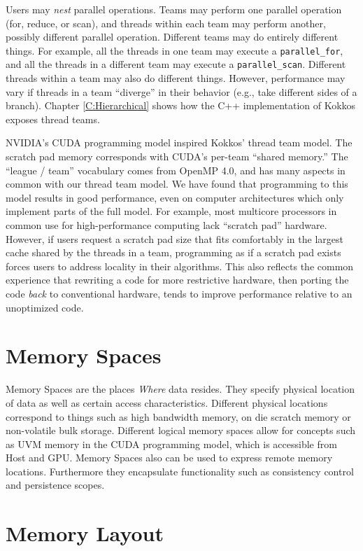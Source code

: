 Users may \emph{nest} parallel operations.
Teams may perform one parallel operation (for, reduce, or scan),
and threads within each team may perform another, possibly different parallel operation.
Different teams may do entirely different things.
For example, all the threads in one team may execute a \lstinline!parallel_for!,
and all the threads in a different team may execute a \lstinline!parallel_scan!.
Different threads within a team may also do different things.
However, performance may vary if threads in a team ``diverge'' in their behavior
(e.g., take different sides of a branch).
Chapter \ref{C:Hierarchical} shows how the C++ implementation of Kokkos exposes thread teams.

NVIDIA's CUDA programming model inspired Kokkos' thread team model.
The scratch pad memory corresponds with CUDA's per-team ``shared memory.''
The ``league / team'' vocabulary comes from OpenMP 4.0,
and has many aspects in common with our thread team model.
We have found that programming to this model results in good performance,
even on computer architectures which only implement parts of the full model.
For example, most multicore processors in common use for high-performance computing lack ``scratch pad'' hardware.
However, if users request a scratch pad size that fits comfortably in the largest cache shared by the threads in a team,
programming as if a scratch pad exists forces users to address locality in their algorithms.
This also reflects the common experience that rewriting a code for more restrictive hardware,
then porting the code \emph{back} to conventional hardware,
tends to improve performance relative to an unoptimized code.

\section{Memory Spaces}

Memory Spaces are the places {\it Where} data resides.
They specify physical location of data as well as certain access characteristics. 
Different physical locations correspond to things such as high bandwidth memory, on die scratch memory or non-volatile bulk storage.
Different logical memory spaces allow for concepts such as UVM memory in the CUDA programming model, which is accessible from Host and GPU. 
Memory Spaces also can be used to express remote memory locations.
Furthermore they encapsulate functionality such as consistency control and persistence scopes.

\section{Memory Layout}

